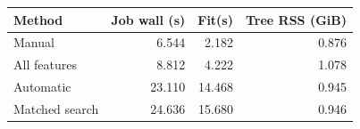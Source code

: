 \begin{center}\small\begin{tabular}{lrrr}\toprule Method & Job wall (s) & Fit(s) & Tree RSS (GiB)\\\midrule
Manual & 6.544 & 2.182 & 0.876 \\
All features & 8.812 & 4.222 & 1.078 \\
Automatic & 23.110 & 14.468 & 0.945 \\
Matched search & 24.636 & 15.680 & 0.946 \\\bottomrule\end{tabular}\end{center}

